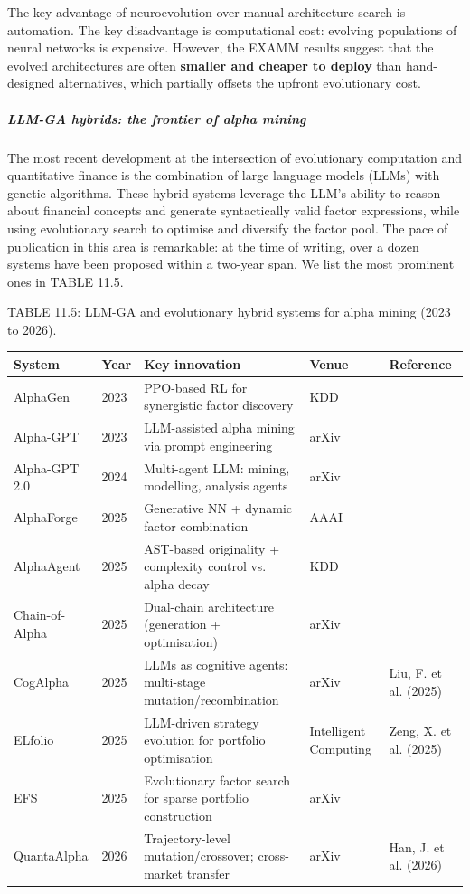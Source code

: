 The key advantage of neuroevolution over manual architecture search is automation. The key disadvantage is computational cost: evolving populations of neural networks is expensive. However, the EXAMM results suggest that the evolved architectures are often \textbf{smaller and cheaper to deploy} than hand-designed alternatives, which partially offsets the upfront evolutionary cost.

\subparagraph{LLM-GA hybrids: the frontier of alpha mining}

The most recent development at the intersection of evolutionary computation and quantitative finance is the combination of large language models (LLMs) with genetic algorithms. These hybrid systems leverage the LLM's ability to reason about financial concepts and generate syntactically valid factor expressions, while using evolutionary search to optimise and diversify the factor pool. The pace of publication in this area is remarkable: at the time of writing, over a dozen systems have been proposed within a two-year span. We list the most prominent ones in TABLE 11.5.

TABLE 11.5: LLM-GA and evolutionary hybrid systems for alpha mining (2023 to 2026).

\bigskip\noindent
\begin{tabular}{p{}p{}p{}p{}p{}}
\toprule
System & Year & Key innovation & Venue & Reference \\
\hline
AlphaGen & 2023 & PPO-based RL for synergistic factor discovery & KDD & \cite{Yu2023} \\
Alpha-GPT & 2023 & LLM-assisted alpha mining via prompt engineering & arXiv & \cite{wang2023alphagpt} \\
Alpha-GPT 2.0 & 2024 & Multi-agent LLM: mining, modelling, analysis agents & arXiv & \cite{Yuan2024} \\
AlphaForge & 2025 & Generative NN + dynamic factor combination & AAAI & \cite{Shi2025} \\
AlphaAgent & 2025 & AST-based originality + complexity control vs. alpha decay & KDD & \cite{tang2025alphaagent} \\
Chain-of-Alpha & 2025 & Dual-chain architecture (generation + optimisation) & arXiv & \cite{Cao2025} \\
CogAlpha & 2025 & LLMs as cognitive agents: multi-stage mutation/recombination & arXiv & Liu, F. et al. (2025) \\
ELfolio & 2025 & LLM-driven strategy evolution for portfolio optimisation & Intelligent Computing & Zeng, X. et al. (2025) \\
EFS & 2025 & Evolutionary factor search for sparse portfolio construction & arXiv & \cite{Luo2025} \\
QuantaAlpha & 2026 & Trajectory-level mutation/crossover; cross-market transfer & arXiv & Han, J. et al. (2026) \\
\bottomrule
\end{tabular}

